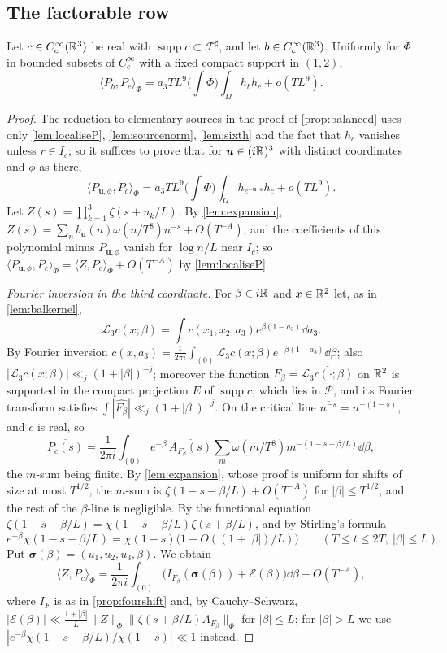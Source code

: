 \documentclass[11pt,colorlinks]{charlie}
\newcommand{\Om}{\Omega}
\newcommand{\ip}[2]{\langle #1,#2\rangle}
\begin{document}
\subsection{The factorable row}
\begin{proposition}\label{prop:factorable}
Let $c\in C_c^\infty(\mathbb{R}^3)$ be real with $\operatorname{supp}c\subset\mathcal F^\sharp$, and let $b\in C_c^\infty(\mathbb{R}^3)$. Uniformly for $\Phi$ in bounded subsets of $C_c^\infty$ with a fixed compact support in $(1,2)$,
\[
 \ip{P_b}{P_c}_\Phi=a_3TL^9\Big(\int\Phi\Big)\int_\Om h_bh_c+o(TL^9).
\]
\end{proposition}
\begin{proof}
The reduction to elementary sources in the proof of \cref{prop:balanced} uses only \cref{lem:localiseP}, \cref{lem:sourcenorm}, \cref{lem:sixth} and the fact that $h_c$ vanishes unless $r\in I_c$; so it suffices to prove that for $\boldsymbol u\in(i\mathbb{R})^3$ with distinct coordinates and $\phi$ as there,
\begin{equation}\label{eq:factelementary}
 \ip{P_{\boldsymbol u,\phi}}{P_c}_\Phi=a_3TL^9\Big(\int\Phi\Big)\int_\Om h_{e^{-\boldsymbol u\cdot a}}h_c+o(TL^9).
\end{equation}
Let $Z(s)=\prod_{k=1}^3\zeta(s+u_k/L)$. By \cref{lem:expansion}, $Z(s)=\sum_nb_{\boldsymbol u}(n)\omega(n/T^8)n^{-s}+O(T^{-A})$, and the coefficients of this polynomial minus $P_{\boldsymbol u,\phi}$ vanish for $\log n/L$ near $I_c$; so $\ip{P_{\boldsymbol u,\phi}}{P_c}_\Phi=\ip Z{P_c}_\Phi+O(T^{-A})$ by \cref{lem:localiseP}.

\emph{Fourier inversion in the third coordinate.} For $\beta\in i\mathbb{R}$ and $x\in\mathbb{R}^2$ let, as in \cref{lem:balkernel},
\[
 \mathcal L_3c(x;\beta)=\int c(x_1,x_2,a_3)e^{\beta(1-a_3)}\dd a_3 .
\]
By Fourier inversion $c(x,a_3)=\frac1{2\pi i}\int_{(0)}\mathcal L_3c(x;\beta)e^{-\beta(1-a_3)}\dd\beta$;
also $|\mathcal L_3c(x;\beta)|\ll_j(1+|\beta|)^{-j}$; moreover the function $F_\beta=\overline{\mathcal L_3c(\cdot;\beta)}$ on $\mathbb{R}^2$ is supported in the compact projection $E$ of $\operatorname{supp}c$, which lies in $\mathcal P$, and its Fourier transform satisfies $\int|\widehat{F_\beta}|\ll_j(1+|\beta|)^{-j}$. On the critical line $\overline{n^{-s}}=n^{-(1-s)}$, and $c$ is real, so
\[
 \overline{P_c(s)}=\frac1{2\pi i}\int_{(0)}e^{-\beta}\,\overline{A_{F_\beta}(s)}\sum_m\omega(m/T^8)m^{-(1-s-\beta/L)}\dd\beta,
\]
the $m$-sum being finite. By \cref{lem:expansion}, whose proof is uniform for shifts of size at most $T^{1/2}$, the $m$-sum is $\zeta(1-s-\beta/L)+O(T^{-A})$ for $|\beta|\le T^{1/2}$, and the rest of the $\beta$-line is negligible. By the functional equation $\zeta(1-s-\beta/L)=\chi(1-s-\beta/L)\zeta(s+\beta/L)$, and by Stirling's formula
\[
 e^{-\beta}\chi(1-s-\beta/L)=\chi(1-s)\big(1+O((1+|\beta|)/L)\big)\qquad(T\le t\le2T,\ |\beta|\le L).
\]
Put $\boldsymbol\sigma(\beta)=(u_1,u_2,u_3,\beta)$. We obtain
\[
 \ip Z{P_c}_\Phi=\frac1{2\pi i}\int_{(0)}\Big(I_{F_\beta}(\boldsymbol\sigma(\beta))+\mathcal E(\beta)\Big)\dd\beta+O(T^{-A}),
\]
where $I_F$ is as in \cref{prop:fourshift} and, by Cauchy--Schwarz, $|\mathcal E(\beta)|\ll\frac{1+|\beta|}L\|Z\|_\Phi\|\zeta(s+\beta/L)A_{F_\beta}\|_\Phi$ for $|\beta|\le L$; for $|\beta|>L$ we use $|e^{-\beta}\chi(1-s-\beta/L)/\chi(1-s)|\ll1$ instead.


\end{proof}
\end{document}
